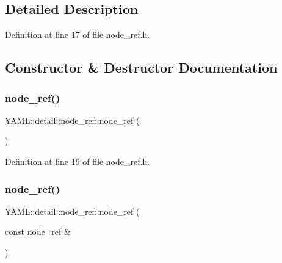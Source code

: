 \subsection{Detailed Description}


Definition at line 17 of file node\+\_\+ref.\+h.



\subsection{Constructor \& Destructor Documentation}
\mbox{\label{class_y_a_m_l_1_1detail_1_1node__ref_ae5041efdcc47629574078dfdf2d9ca0e}} 
\subsubsection{\texorpdfstring{node\_ref()}{node\_ref()}\hspace{0.1cm}{\footnotesize\ttfamily [1/2]}}
{\footnotesize\ttfamily Y\+A\+M\+L\+::detail\+::node\+\_\+ref\+::node\+\_\+ref (\begin{DoxyParamCaption}{ }\end{DoxyParamCaption})\hspace{0.3cm}{\ttfamily [inline]}}



Definition at line 19 of file node\+\_\+ref.\+h.

\mbox{\label{class_y_a_m_l_1_1detail_1_1node__ref_a3bec7e366695b27c9f21bc1bd7722087}} 
\subsubsection{\texorpdfstring{node\_ref()}{node\_ref()}\hspace{0.1cm}{\footnotesize\ttfamily [2/2]}}
{\footnotesize\ttfamily Y\+A\+M\+L\+::detail\+::node\+\_\+ref\+::node\+\_\+ref (\begin{DoxyParamCaption}\item[{const \mbox{\hyperlink{class_y_a_m_l_1_1detail_1_1node__ref}{node\+\_\+ref}} \&}]{ }\end{DoxyParamCaption})\hspace{0.3cm}{\ttfamily [delete]}}




